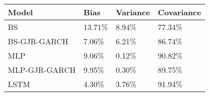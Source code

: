 \begin{tabular}{llll}
\toprule
Model & Bias & Variance & Covariance \\
\midrule
BS & 13.71\% & 8.94\% & 77.34\% \\
BS-GJR-GARCH & 7.06\% & 6.21\% & 86.74\% \\
MLP & 9.06\% & 0.12\% & 90.82\% \\
MLP-GJR-GARCH & 9.95\% & 0.30\% & 89.75\% \\
LSTM & 4.30\% & 3.76\% & 91.94\% \\
\bottomrule
\end{tabular}
